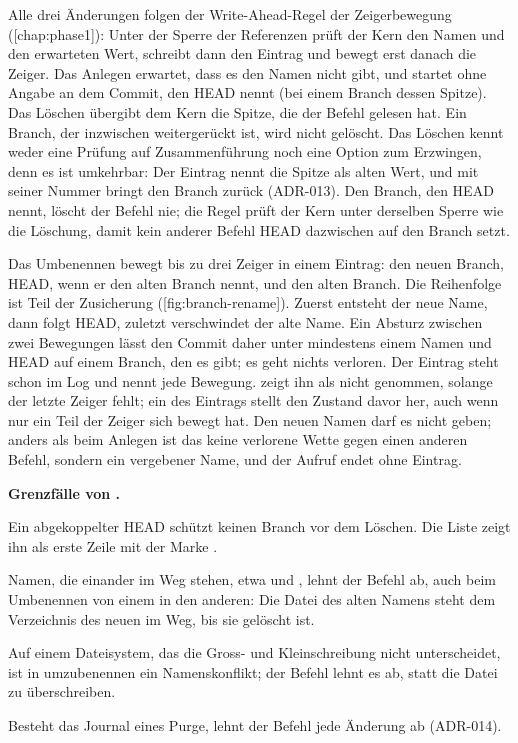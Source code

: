 Alle drei Änderungen folgen der Write-Ahead-Regel der Zeigerbewegung ([chap:phase1]):
Unter der Sperre der Referenzen prüft der Kern den Namen und den erwarteten Wert,
schreibt dann den Eintrag und bewegt erst danach die Zeiger.
Das Anlegen erwartet, dass es den Namen nicht gibt, und startet
ohne Angabe an dem Commit, den HEAD nennt (bei einem Branch dessen Spitze).
Das Löschen übergibt dem Kern die Spitze, die der Befehl gelesen hat.
Ein Branch, der inzwischen weitergerückt ist, wird nicht gelöscht.
Das Löschen kennt weder eine Prüfung auf Zusammenführung noch eine Option zum Erzwingen,
denn es ist umkehrbar:
Der Eintrag nennt die Spitze als alten Wert, und  mit seiner Nummer
bringt den Branch zurück (ADR-013). Den Branch, den HEAD nennt, löscht der Befehl nie; die Regel
prüft der Kern unter derselben Sperre wie die Löschung, damit kein anderer Befehl HEAD dazwischen
auf den Branch setzt.

Das Umbenennen bewegt bis zu drei Zeiger in einem Eintrag: den neuen Branch, HEAD, wenn er den
alten Branch nennt, und den alten Branch. Die Reihenfolge ist Teil der Zusicherung
([fig:branch-rename]). Zuerst entsteht der neue Name, dann folgt HEAD, zuletzt
verschwindet der alte Name. Ein Absturz zwischen zwei Bewegungen lässt den Commit daher unter
mindestens einem Namen und HEAD auf einem Branch, den es gibt; es geht nichts verloren. Der
Eintrag steht schon im Log und nennt jede Bewegung.  zeigt ihn als nicht
genommen, solange der letzte Zeiger fehlt; ein  des Eintrags stellt den Zustand
davor her, auch wenn nur ein Teil der Zeiger sich bewegt hat. Den neuen Namen darf es nicht geben;
anders als beim Anlegen ist das keine verlorene Wette gegen einen anderen Befehl, sondern ein
vergebener Name, und der Aufruf endet ohne Eintrag.

\startplacefigure[title={Zeiger beim Umbenennen von \type{main} in \type{trunk}, mit den
    Zuständen nach einem Absturz},reference=fig:branch-rename,location=here]
\stopplacefigure

\startinfobox
{\bf Grenzfälle von .}
\startitemize
\item Ein abgekoppelter HEAD schützt keinen Branch vor dem Löschen. Die Liste zeigt ihn als erste
Zeile mit der Marke .
\item Namen, die einander im Weg stehen, etwa  und , lehnt der Befehl ab, auch
beim Umbenennen von einem in den anderen: Die Datei des alten Namens steht dem Verzeichnis des
neuen im Weg, bis sie gelöscht ist.
\item Auf einem Dateisystem, das die Gross- und Kleinschreibung nicht unterscheidet, ist
 in  umzubenennen ein Namenskonflikt; der Befehl lehnt es ab, statt die
Datei zu überschreiben.
\item Besteht das Journal eines Purge, lehnt der Befehl jede Änderung ab (ADR-014).
\stopitemize
\stopinfobox

